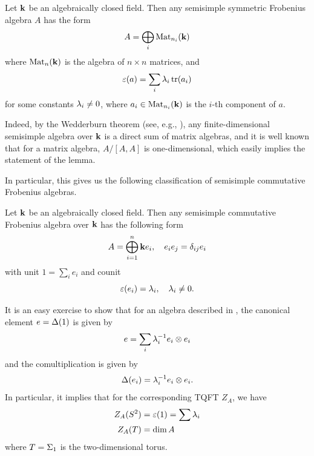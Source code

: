 \begin{lemma}\label{l:frobenius-ss}
  Let $\mathbf{k}$ be an algebraically closed field.
  Then any semisimple symmetric Frobenius algebra $A$ has the form
  $$
    A=\bigoplus_i \operatorname{Mat}_{n_i}(\mathbf{k})
  $$
  where $\operatorname{Mat}_n(\mathbf{k})$ is the algebra of $n\times n$ matrices, and
  $$
  \varepsilon(a)=\sum_i \lambda_i \operatorname{tr}(a_i)
  $$
  for some constants $\lambda_i\ne 0$, where $a_i\in\operatorname{Mat}_{n_i}(\mathbf{k})$ is the
  $i$-th component of $a$.
\end{lemma}
Indeed, by the Wedderburn theorem (see, e.g., \cite[Section 3.5]{pierce}), any
finite-dimensional semisimple algebra over $\mathbf{k}$ is a direct sum of matrix
algebras, and it is well known that for a matrix algebra, $A/[A,A]$ is
one-dimensional, which easily implies the statement of the lemma.

In particular, this gives us the following classification
of semisimple commutative Frobenius algebras.

\begin{theorem}\label{t:frobenius_commutative}
  Let $\mathbf{k}$ be an algebraically closed field. Then
  any semisimple commutative Frobenius algebra over $\mathbf{k}$ has the following
  form
  $$
  A=\bigoplus_{i=1}^n \mathbf{k} e_i, \quad e_ie_j=\delta_{ij}e_i
  $$
  with unit $1=\sum_i e_i$ and counit
  $$
  \varepsilon(e_i)=\lambda_i, \quad \lambda_i\ne 0.
  $$
\end{theorem}

It is an easy exercise to show that for an algebra described in
, the canonical element $e=\Delta(1)$ is given by
$$
e= \sum_i \lambda_i^{-1}e_i\otimes e_i
$$
and the comultiplication is given by
$$
\Delta(e_i)=\lambda_i^{-1}e_i\otimes e_i.
$$
In particular, it implies that for the corresponding TQFT $Z_A$, we have
\begin{align*}
  Z_A(S^2)&=\varepsilon(1)=\sum \lambda_i\\
  Z_A(T)&=\dim A
\end{align*}
where $T=\Sigma_1$ is the two-dimensional torus.

